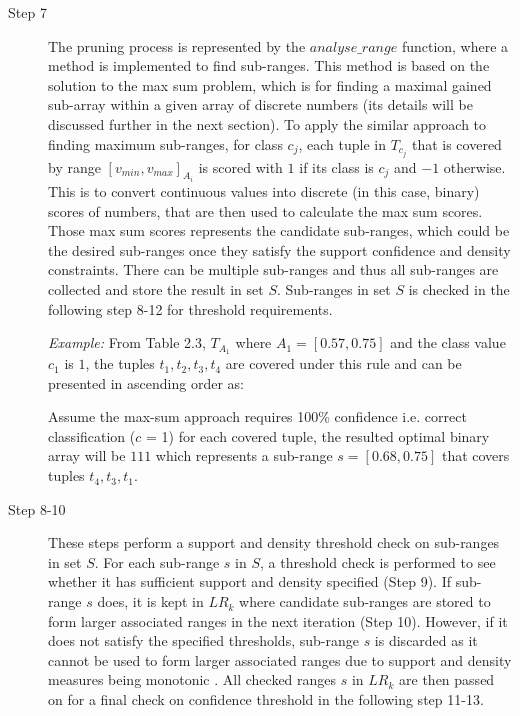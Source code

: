 \begin{description}
\item[Step 7] The pruning process is represented by the $analyse\_range$ function, where a method is implemented to find sub-ranges. This method is based on the solution to the max sum problem, which is for finding a maximal gained sub-array within a given array of discrete numbers (its details will be discussed further in the next section). To apply the similar approach to finding maximum sub-ranges, for class $c_j$, each tuple in $T_{c_j}$ that is covered by range $[v_{min}, v_{max}]_{A_i}$ is scored with $1$ if its class is $c_j$ and $-1$ otherwise. This is to convert continuous values into discrete (in this case, binary) scores of numbers, that are then used to calculate the max sum scores. Those max sum scores represents the candidate sub-ranges, which could be the desired sub-ranges once they satisfy the support confidence and density constraints. There can be multiple sub-ranges and thus all sub-ranges are collected and store the result in set $S$. Sub-ranges in set $S$ is checked in the following step 8-12 for threshold requirements. 

\textit{Example: } From Table 2.3, $T_{A_1}$ where $A_1 = [0.57, 0.75]$ and the class value $c_1$ is $1$, the tuples ${t_1,t_2,t_3,t_4}$ are covered under this rule and can be presented in ascending order as: 


Assume the max-sum approach requires 100\% confidence i.e. correct classification ($c$ = 1) for each covered tuple, the resulted optimal binary array will be ${ 1 1 1 }$ which represents a sub-range $s = [0.68, 0.75]$ that covers tuples ${t_4,t_3,t_1}$.

\item[Step 8-10] These steps perform a support and density threshold check on sub-ranges in set $S$. For each sub-range $s$ in $S$, a threshold check is performed to see whether it has sufficient support and density specified (Step 9). If sub-range $s$ does, it is kept in $LR_k$ where candidate sub-ranges are stored to form larger associated ranges in the next iteration (Step 10). However, if it does not satisfy the specified thresholds, sub-range $s$ is discarded as it cannot be used to form larger associated ranges due to support and density measures being monotonic \cite{monotonic}. All checked ranges $s$ in $LR_k$ are then passed on for a final check on confidence threshold in the following step 11-13.
 

\end{description}
